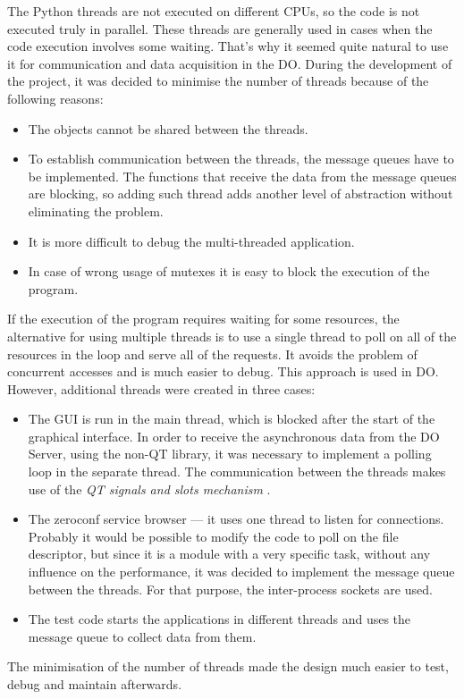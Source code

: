     The Python threads are not executed on different CPUs, so the code is not executed truly in parallel. These threads are generally used in cases when the code execution involves some waiting. That's why it seemed quite natural to use it for communication and data acquisition in the DO. During the development of the project, it was decided to minimise the number of threads because of the following reasons:
    \begin{itemize}
        \item The objects cannot be shared between the threads.
        \item To establish communication between the threads, the message queues have to be implemented. The functions that receive the data from the message queues are blocking, so adding such thread adds another level of abstraction without eliminating the problem.
        \item It is more difficult to debug the multi-threaded application.
        \item In case of wrong usage of mutexes it is easy to block the execution of the program.
    \end{itemize}
    
    If the execution of the program requires waiting for some resources, the alternative for using multiple threads is to use a single thread to poll on all of the resources in the loop and serve all of the requests. It avoids the problem of concurrent accesses and is much easier to debug. This approach is used in DO. However, additional threads were created in three cases:
    \begin{itemize}
        \item The GUI is run in the main thread, which is blocked after the start of the graphical interface. In order to receive the asynchronous data from the DO Server, using the non-QT library, it was necessary to implement a polling loop in the separate thread. The communication between the threads makes use of the \textit{QT signals and slots mechanism} \cite{qt_signals_slots}.
        \item The zeroconf service browser --- it uses one thread to listen for connections. Probably it would be possible to modify the code to poll on the file descriptor, but since it is a module with a very specific task, without any influence on the performance, it was decided to implement the message queue between the threads. For that purpose, the inter-process sockets are used.
        \item The test code starts the applications in different threads and uses the message queue to collect data from them.
    \end{itemize}
    The minimisation of the number of threads made the design much easier to test, debug and maintain afterwards.


